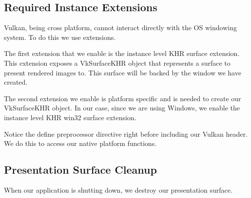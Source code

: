 \begin{minipage}{\linewidth}{\noindent}
    
\end{minipage}

\subsection{Required Instance Extensions}

Vulkan, being cross platform, cannot interact directly with the OS windowing system.
To do this we use extensions.

The first extension that we enable is the instance level KHR surface extension.
This extension exposes a VkSurfaceKHR object that represents a surface to present
rendered images to.
This surface will be backed by the window we have created.

The second extension we enable is platform specific and is needed
to create our VkSurfaceKHR object.
In our case, since we are using Windows, we enable the instance level KHR win32
surface extension.

\begin{minipage}{\linewidth}{\noindent}
    
\end{minipage}

Notice the define preprocessor directive right before including our Vulkan header.
We do this to access our native platform functions.

\subsection{Presentation Surface Cleanup}

When our application is shutting down, we destroy our presentation surface.

\begin{minipage}{\linewidth}{\noindent}
    
\end{minipage}

